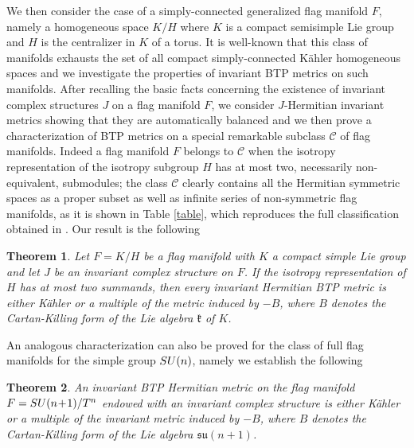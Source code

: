 \documentclass{amsart}
\numberwithin{equation}{section}
\newtheorem{theorem} {Theorem} [section]
\theoremstyle{definition}
\renewcommand{\1}{\mathds{1}}
\newcommand{\gk}{\mathfrak k}
\newcommand{\SU}{\rm {SU}}
\newcommand{\T}{\rm{T}}
\renewcommand{\>}{\rightarrow}
\begin{document}
We then consider the case of a simply-connected generalized flag manifold $F$, namely a homogeneous space $K/H$ where $K$ is a compact semisimple Lie group and $H$ is the centralizer in $K$ of a torus. It is well-known that this class of manifolds exhausts the set of all compact simply-connected K\"ahler homogeneous spaces and we investigate the properties of invariant BTP metrics on such manifolds. After recalling the basic facts concerning the existence of invariant complex structures $J$ on a flag manifold $F$, we consider $J$-Hermitian invariant metrics showing that they are automatically balanced and we then prove a characterization of BTP metrics on a special remarkable subclass $\mathcal C$ of flag manifolds. Indeed a flag manifold $F$ belongs to $\mathcal C$ when the isotropy representation of the isotropy subgroup $H$ has at most two, necessarily non-equivalent, submodules; the class $\mathcal C$ clearly contains all the Hermitian symmetric spaces as a proper subset as well as infinite series of non-symmetric flag manifolds, as it is shown in Table \eqref{table}, which reproduces the full classification obtained in \cite{AC}. Our result is the following
\begin{theorem}\label{flag2summ} Let $F=K/H$ be a flag manifold with $K$ a compact simple Lie group and let $J$ be an invariant complex structure on $F$. If the isotropy representation of $H$ has at most two summands, then every invariant Hermitian {\rm BTP} metric is either K\"ahler or a multiple of the metric induced by $-B$, where $B$ denotes the Cartan-Killing form of the Lie algebra $\gk$ of $K$.  \end{theorem}
An analogous characterization can also be proved for the class of full flag manifolds for the simple group $\SU(n)$, namely we establish the following
\begin{theorem}\label{SU} An invariant {\rm BTP} Hermitian metric on the flag manifold $F=\SU(n\!+\!1)/\T^n$ endowed with an invariant complex structure is either K\"ahler or a multiple of the invariant metric induced by $-B$, where $B$ denotes the Cartan-Killing form of the Lie algebra $\mathfrak{su}(n\!+\!1)$.
\end{theorem}
\end{document}
